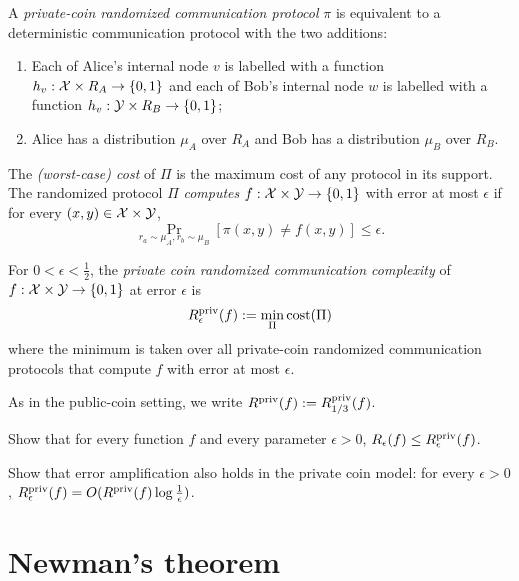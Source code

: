 \begin{definition}
	A \emph{private-coin randomized communication protocol} $\pi$ is equivalent to a deterministic communication protocol with the two additions: 
	\begin{enumerate}
		\item Each of Alice's internal node $v$ is labelled with a function $h_v : \mathcal{X} \times R_A \to \{0,1\}$ and each of Bob's internal node $w$ is labelled with a function $h_v : \mathcal{Y} \times R_B \to \{0,1\}$; 
		\item Alice has a distribution $\mu_A$ over $R_A$ and Bob has a distribution $\mu_B$ over $R_B$.
	\end{enumerate}
	The \emph{(worst-case) cost} of $\Pi$ is the maximum cost of any protocol in its support. The randomized protocol $\Pi$ \emph{computes} $f : \mathcal{X} \times \mathcal{Y} \to \{0,1\}$ with error at most $\epsilon$ if for every $(x,y) \in \mathcal{X} \times \mathcal{Y}$,
	\[
	\Pr_{r_a \sim \mu_A, r_b \sim \mu_B}[ \pi(x,y) \neq f(x,y) ] \le \epsilon.
	\]
\end{definition}


\begin{definition}
	For $0 < \epsilon < \frac12$, the \emph{private coin randomized communication complexity} of $f : \mathcal{X} \times \mathcal{Y} \to \{0,1\}$ at error $\epsilon$ is
	\[
	R^{\mathrm{priv}}_\epsilon(f) := \min_{\Pi} \mathrm{cost}(\Pi)
	\]
	where the minimum is taken over all private-coin randomized communication protocols that compute $f$ with error at most $\epsilon$.
\end{definition}

\begin{remark}
	As in the public-coin setting, we write $R^{\mathrm{priv}}(f) := R^{\mathrm{priv}}_{1/3}(f)$.
\end{remark}
\exercises

\begin{exercise}
	Show that for every function $f$ and every parameter $\epsilon > 0$, 
	$R_\epsilon(f) \le R^{\mathrm{priv}}_\epsilon(f)$.
\end{exercise}

\begin{exercise}
	Show that error amplification also holds in the private coin model: for every $\epsilon > 0$, $R^{\mathrm{priv}}_\epsilon(f) = O(R^{\mathrm{priv}}(f) \log \frac1\epsilon)$.
\end{exercise}



\section{Newman's theorem}

